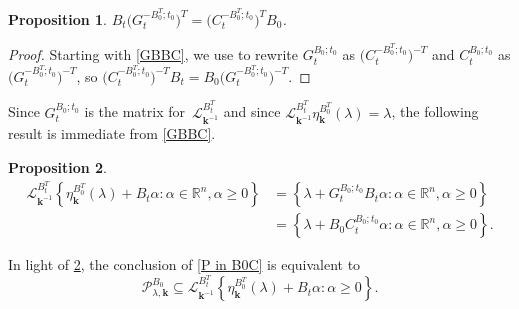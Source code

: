 \documentclass{amsart}
\newtheorem{proposition}{Proposition}[section]
\theoremstyle{definition}
\theoremstyle{remark}
\numberwithin{equation}{section}
\newcommand{\reals}{\mathbb R}
\newcommand{\set}[1]{{\left\lbrace #1 \right\rbrace}}
\newcommand{\0}{{\mathbf{0}}}
\newcommand{\kk}{\mathbf{k}}
\renewcommand{\L}{\mathcal{L}}
\renewcommand{\P}{\mathcal{P}}
\begin{document}
\begin{proposition}\label{BGCB}
$B_t\bigl(G_t^{-B_0^T;t_0}\bigr)^T=\bigl(C_t^{-B_0^T;t_0}\bigr)^TB_0$.
\end{proposition}
\begin{proof}
Starting with \cref{GBBC}, we use \cite[Theorem~1.2]{NZ} to rewrite $G_t^{B_0;t_0}$ as $\bigl(C_t^{-B_0^T;t_0}\bigr)^{-T}$ and $C_t^{B_0;t_0}$ as $\bigl(G_t^{-B_0^T;t_0}\bigr)^{-T}$, so $\bigl(C_t^{-B_0^T;t_0}\bigr)^{-T}B_t=B_0\bigl(G_t^{-B_0^T;t_0}\bigr)^{-T}$.
\end{proof}

Since $G_t^{B_0;t_0}$ is the matrix for~$\L_{\kk^{-1}}^{B_t^T}$ and since $\L_{\kk^{-1}}^{B_t^T}\eta_\kk^{B_0^T}(\lambda)=\lambda$, the following result is immediate from \cref{GBBC}.

\begin{proposition}\label{B0C}
\begin{align*}
\L_{\kk^{-1}}^{B_t^T}\set{\eta_\kk^{B_0^T}(\lambda)+B_t\alpha:\alpha\in\reals^n,\alpha\ge0}
&=\set{\lambda+G_t^{B_0;t_0}B_t\alpha:\alpha\in\reals^n,\alpha\ge0}\\
&=\set{\lambda+B_0C_t^{B_0;t_0}\alpha:\alpha\in\reals^n,\alpha\ge0}.
\end{align*}
\end{proposition}

In light of \cref{B0C}, the conclusion of \cref{P in B0C} is equivalent to
\[\P^{B_0}_{\lambda,\kk}\subseteq\L_{\kk^{-1}}^{B_t^T}\set{\eta_\kk^{B_0^T}(\lambda)+B_t\alpha:\alpha\ge0}.\]

%
\end{document}

